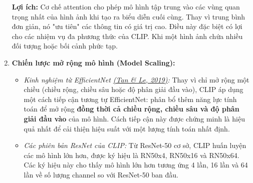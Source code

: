 \begin{enumerate}
\textbf{Lợi ích:} Cơ chế attention cho phép mô hình tập trung vào các vùng quan trọng nhất của hình ảnh khi tạo ra biểu diễn cuối cùng. Thay vì trung bình đơn giản, nó "ưu tiên" các thông tin có giá trị cao. Điều này đặc biệt có lợi cho các nhiệm vụ đa phương thức của CLIP. Khi một hình ảnh chứa nhiều đối tượng hoặc bối cảnh phức tạp.

\item \textbf{Chiến lược mở rộng mô hình (Model Scaling):}
\begin{itemize}
\item \textit{Kinh nghiệm từ EfficientNet \hyperref[efficientnet]{(Tan \& Le, 2019)}:} Thay vì chỉ mở rộng một chiều (chiều rộng, chiều sâu hoặc độ phân giải đầu vào), CLIP áp dụng một cách tiếp cận tương tự EfficientNet: phân bổ thêm năng lực tính toán để mở rộng \textbf{đồng thời cả chiều rộng, chiều sâu và độ phân giải đầu vào} của mô hình. Cách tiếp cận này được chứng minh là hiệu quả nhất để cải thiện hiệu suất với một lượng tính toán nhất định.
\item \textit{Các phiên bản ResNet của CLIP:} Từ ResNet-50 cơ sở, CLIP huấn luyện các mô hình lớn hơn, được ký hiệu là RN50x4, RN50x16 và RN50x64. Các ký hiệu này cho thấy mô hình lớn hơn tương ứng 4 lần, 16 lần và 64 lần về số lượng channel so với ResNet-50 ban đầu.
\end{itemize}
\end{enumerate}
